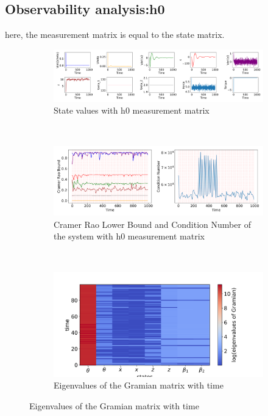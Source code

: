 \documentclass[12pt]{article}
\begin{document}
\subsection*{Observability analysis:h0}
here, the measurement matrix is equal to the state matrix.
\begin{figure}[H]
    \centering
    \begin{subfigure}[t]{\textwidth}
        \centering
        \includegraphics[width=15cm]{figures/states_with_noisy_sinusoidal_x_and_h0.png}
        \caption{State values with h0 measurement matrix}
        \label{supfig:01a}
    \end{subfigure}
    \\
    \begin{subfigure}[t]{\textwidth}
        \centering
        \includegraphics[width=15cm]{figures/crb_and_cn_with_noisy_sinusoidal_x_and_h0.png}
        \caption{Cramer Rao Lower Bound and Condition Number of the system with h0 measurement matrix}
        \label{supfig:01b}
    \end{subfigure}
    \\
    \begin{subfigure}[t]{\textwidth}
        \centering
        \includegraphics[width=15cm]{figures/gramian_eigenvalues_with_noisy_sinusoidal_x_and_h0.png}
        \caption{Eigenvalues of the Gramian matrix with time}
        \label{supfig:01c}
    \end{subfigure}
\end{figure}
\end{document}
